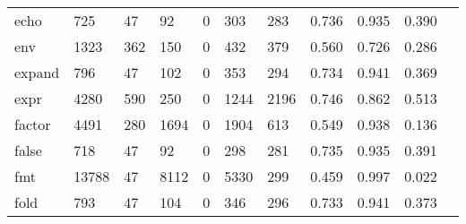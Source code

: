 \begin{longtable}{lp{1.10cm}p{1.10cm}p{1.10cm}p{1.10cm}p{1.10cm}p{1.10cm}p{1.10cm}p{1.10cm}p{1.10cm}p{1.10cm}}
echo      &                    725 &                                 47 &                                92 &                                0 &                               303 &                             283 &                          0.736 &                                 0.935 &                               0.390 \\
env       &                   1323 &                                362 &                               150 &                                0 &                               432 &                             379 &                          0.560 &                                 0.726 &                               0.286 \\
expand    &                    796 &                                 47 &                               102 &                                0 &                               353 &                             294 &                          0.734 &                                 0.941 &                               0.369 \\
expr      &                   4280 &                                590 &                               250 &                                0 &                              1244 &                            2196 &                          0.746 &                                 0.862 &                               0.513 \\
factor    &                   4491 &                                280 &                              1694 &                                0 &                              1904 &                             613 &                          0.549 &                                 0.938 &                               0.136 \\
false     &                    718 &                                 47 &                                92 &                                0 &                               298 &                             281 &                          0.735 &                                 0.935 &                               0.391 \\
fmt       &                  13788 &                                 47 &                              8112 &                                0 &                              5330 &                             299 &                          0.459 &                                 0.997 &                               0.022 \\
fold      &                    793 &                                 47 &                               104 &                                0 &                               346 &                             296 &                          0.733 &                                 0.941 &                               0.373 \\

\end{longtable}
